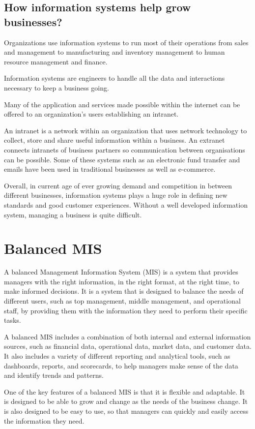 \documentclass[twocolumn, 12pt, a4paper]{article}
\begin{document}
\subsection{How information systems help grow businesses?}
Organizations use information systems to run most of their operations from 
sales and management to manufacturing and inventory management to human
resource management and finance.

Information systems are engineers to handle all the data and interactions
necessary to keep a business going.

Many of the application and services made possible within the internet can be
offered to an organization's users establishing an intranet.

An intranet is a network within an organization that uses network technology
to collect, store and share useful information within a business. An extranet
connects intranets of business partners so communication between organisations
can be possible. Some of these systems such as an electronic fund transfer and
emails have been used in traditional businesses as well as e-commerce.

Overall, in current age of ever growing demand and competition in between
different businesses, information systems plays a huge role in defining new 
standards and good customer experiences. Without a well developed information
system, managing a business is quite difficult.


\section{Balanced MIS}
A balanced Management Information System (MIS) is a system that provides
managers with the right information, in the right format, at the right time,
to make informed decisions. It is a system that is designed to balance the
needs of different users, such as top management, middle management, and
operational staff, by providing them with the information they need to perform
their specific tasks.

A balanced MIS includes a combination of both internal and external
information sources, such as financial data, operational data, market data,
and customer data. It also includes a variety of different reporting and
analytical tools, such as dashboards, reports, and scorecards, to help
managers make sense of the data and identify trends and patterns.

One of the key features of a balanced MIS is that it is flexible and
adaptable. It is designed to be able to grow and change as the needs of the
business change. It is also designed to be easy to use, so that managers can
quickly and easily access the information they need.
\end{document}
